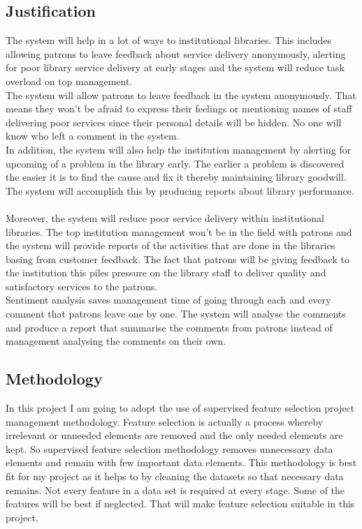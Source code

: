 \documentclass[12pt]{report}
\begin{document}
	\subsection{Justification}
	The system will help in a lot of ways to institutional libraries. This includes allowing patrons to leave feedback about service delivery anonymously, alerting for poor library service delivery at early stages and the system will reduce task overload on top management.\\
	The system will allow patrons to leave feedback in the system anonymously. That means they won’t be afraid to express their feelings or mentioning names of staff delivering poor services since their personal details will be hidden. No one will know who left a comment in the system.\\
	In addition, the system will also help the institution management by alerting for upcoming of a problem in the library early. The earlier a problem is discovered the easier it is to find the cause and fix it thereby maintaining library goodwill. The system will accomplish this by producing reports about library performance.\\
	\\Moreover, the system will reduce poor service delivery within institutional libraries. The top institution management won’t be in the field with patrons and the system will provide reports of the activities that are done in the libraries basing from customer feedback. The fact that patrons will be giving feedback to the institution this piles pressure on the library staff to deliver quality and satisfactory services to the patrons.\\
	Sentiment analysis saves management time of going through each and every comment that patrons leave one by one. The system will analyse the comments and produce a report that summarise the comments from patrons instead of management analysing the comments on their own.
	
	\subsection{Methodology}
	In this project I am going to adopt the use of supervised feature selection project management methodology. Feature selection is actually a process whereby irrelevant or unneeded elements are removed and the only needed elements are kept. So supervised feature selection methodology removes unnecessary data elements and remain with few important data elements. This methodology is best fit for my project as it helps to by cleaning the datasets so that necessary data remains. Not every feature in a data set is required at every stage. Some of the features will be best if neglected. That will make feature selection suitable in this project.
	
\end{document}

